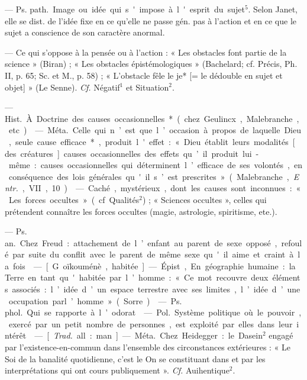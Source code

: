 \begin{itemize}[leftmargin=1cm, label=, itemsep=1pt]
 — \si{Ps. path.} Image ou idée
qui s'impose à l'esprit du sujet$^5$.
Selon Janet, elle se dist. de l’idée
fixe en ce qu’elle ne passe gén. pas à
l’action et en ce que le sujet a conscience de son caractère anormal.

 — Ce qui s'oppose à la
pensée ou à l’action : « Les obstacles
font partie de la science » (Biran) ;
« Les obstacles épistémologiques »
(Bachelard; cf. Précis, Ph. II, p. 65;
Sc. et M., p. 58) ; « L’obstacle fêle
le je* [= le dédouble en sujet et
objet] » (Le Senne). {\it Cf.} Négatif$^1$ et
Situation$^2$.

 — \si{Hist.} À. Doctrine
des causes occasionnelles* (chez
Geulincx, Malebranche, etc.).

 — \si{Méta.} Celle
qui n’est que l’occasion à propos de
laquelle Dieu, seule cause efficace*,
produit l'effet : « Dieu établit leurs
modalités [des créatures] causes
occasionnelles des effets qu’il produit lui-même : causes occasionnelles qui déterminent l’efficace de
ses volontés, en conséquence des lois
générales qu'il s’est prescrites »
(Malebranche, {\it Entr.}, VII, 10).

 — Caché, mystérieux, dont
les causes sont inconnues : « Les
forces occultes » (cf. Qualités$^2$) ;
« Sciences occultes », celles qui prétendent connaître les forces occultes
(magie, astrologie, spiritisme, ete.).

 — \si{Ps. an.} Chez
Freud : attachement de l’enfant au
parent de sexe opposé, refoulé par
suite du conflit avec le parent de
même sexe qu'il aime et craint à la
fois.

 — [G. oïkouménè, habitée]
— Épist, En géographie humaine :
la Terre en tant qu'habitée par
l’homme : « Ce mot recouvre deux
éléments associés : l’idée d’un
espace terrestre avec ses limites,
l’idée d’une occupation parl’homme »
(Sorre).

 — \si{Ps. phol.} Qui se rapporte
à l’odorat.

 — \si{Pol.} Système politique
où le pouvoir, exercé par un petit
nombre de personnes, est exploité
par elles dans leur intérêt.

 — [{\it Trad.} all. : man] — \si{Méta.} Chez
Heidegger : le Dasein$^2$ engagé par
l’existence-en-commun dans l’ensemble des circonstances extérieures :
« Le Soi de la banalité quotidienne,
c’est le On se constituant dans et
par les interprétations qui ont
cours publiquement ». {\it Cf.} Auihentique$^2$.


\end{itemize}
